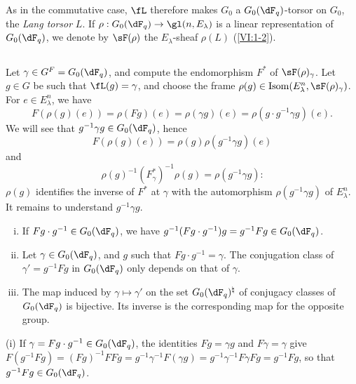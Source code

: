 As in the commutative case, $\fL$ therefore makes $G_0$ a $G_0(\dF_q)$-torsor 
on $G_0$, the \emph{Lang torsor} $L$. If 
$\rho:G_0(\dF_q) \to \gl(n,E_\lambda)$ is a linear representation of 
$G_0(\dF_q)$, we denote by $\sF(\rho)$ the $E_\lambda$-sheaf $\rho(L)$ 
(\ref{VI:1-2}). 





\subsection{}\label{VI:1-23}

Let $\gamma\in G^F=G_0(\dF_q)$, and compute the endomorphism $F^\ast$ of 
$\sF(\rho)_\gamma$. Let $g\in G$ be such that $\fL(g)=\gamma$, and choose the frame 
$\rho(g)\in \operatorname{Isom}(E_\lambda^n,\sF(\rho)_\gamma)$. For 
$e\in E_\lambda^n$, we have 
\[
  F(\rho(g)(e)) = \rho(F g)(e) = \rho(\gamma g)(e) = \rho(g\cdot g^{-1}\gamma g)(e) \text{.}
\]
We will see that $g^{-1} \gamma g\in G_0(\dF_q)$, hence 
\[
  F(\rho(g)(e)) = \rho(g) \rho(g^{-1}\gamma g)(e)
\]
and 
\begin{equation*}\tag{1.23.1}\label{VI:eq:1-23-1}
  \rho(g)^{-1} (F_\gamma^\ast)^{-1} \rho(g) = \rho(g^{-1} \gamma g) \text{:}
\end{equation*}
$\rho(g)$ identifies the inverse of $F^\ast$ at $\gamma$ with the automorphism 
$\rho(g^{-1} \gamma g)$ of $E_\lambda^n$. It remains to understand 
$g^{-1} \gamma g$.

\begin{lemma_}\label{VI:1-24}
\begin{enumerate}[(i)]
  \item If $F g\cdot g^{-1} \in G_0(\dF_q)$, we have 
    $g^{-1} (F g\cdot g^{-1}) g = g^{-1} F g\in G_0(\dF_q)$.
  \item Let $\gamma\in G_0(\dF_q)$, and $g$ such that 
    $F g\cdot g^{-1} = \gamma$. The conjugation class of $\gamma'=g^{-1} Fg$ 
    in $G_0(\dF_q)$ only depends on that of $\gamma$. 
  \item The map induced by $\gamma\mapsto \gamma'$ on the set 
    $G_0(\dF_q)^\natural$ of conjugacy classes of $G_0(\dF_q)$ 
    is bijective. Its inverse is the corresponding map for the opposite 
    group. 
\end{enumerate}
\end{lemma_}

(i) If $\gamma= F g\cdot g^{-1}\in G_0(\dF_q)$, the identities $F g=\gamma g$ 
and 
$F\gamma=\gamma$ give $F(g^{-1} F g) = (F g)^{-1} F F g = g^{-1} \gamma^{-1} F(\gamma g) = g^{-1} \gamma^{-1} F \gamma F g = g^{-1} F g$, 
so that $g^{-1} F g \in G_0(\dF_q)$. 

